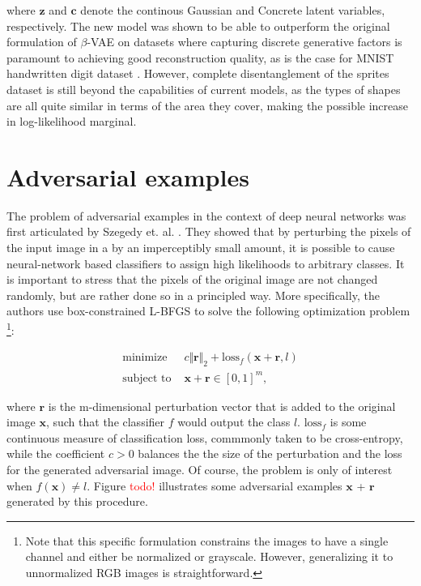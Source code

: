 \documentclass{report}
\newcommand\todo[1]{\textcolor{red}{#1}}
\begin{document}
\bigskip

\noindent where $\boldsymbol{z}$ and $\boldsymbol{c}$ denote the continous Gaussian and Concrete latent variables, respectively. The new model was shown to be able to outperform the original formulation of $\beta$-VAE on datasets where capturing discrete generative factors is paramount to achieving good reconstruction quality, as is the case for MNIST handwritten digit dataset \cite{mnist}. However, complete disentanglement of the sprites dataset is still beyond the capabilities of current models, as the types of shapes are all quite similar in terms of the area they cover, making the possible increase in log-likelihood marginal.

\section{Adversarial examples}

\noindent The problem of adversarial examples in the context of deep neural networks was first articulated by Szegedy et. al. \cite{intriguing-properties}. They showed that by perturbing the pixels of the input image in a by an imperceptibly small amount, it is possible to cause neural-network based classifiers to assign high likelihoods to arbitrary classes. It is important to stress that the pixels of the original image are not changed randomly, but are rather done so in a principled way. More specifically, the authors use box-constrained L-BFGS \cite{NoceWrig06} to solve the following optimization problem \footnote{Note that this specific formulation constrains the images to have a single channel and either be normalized or grayscale. However, generalizing it to unnormalized RGB images is straightforward.}:

\begin{equation}
\begin{aligned}
\text{minimize } &c \Vert \boldsymbol{r} \Vert_2 + \text{loss}_f(\boldsymbol{x}+\boldsymbol{r}, l) \\
\text{subject to } &\boldsymbol{x} + \boldsymbol{r} \in [0, 1]^m,
\end{aligned}
\label{eq:adv-class-opt}
\end{equation}

\bigskip

\noindent where $\boldsymbol{r}$ is the m-dimensional perturbation vector that is added to the original image $\boldsymbol{x}$, such that the classifier $f$ would output the class $l$. $\text{loss}_f$ is some continuous measure of classification loss, commmonly taken to be cross-entropy, while the coefficient $c > 0$ balances the the size of the perturbation and the loss for the generated adversarial image. Of course, the problem is only of interest when $f(\boldsymbol{x}) \neq l$. Figure \todo{todo!} illustrates some adversarial examples $\boldsymbol{x}$ + $\boldsymbol{r}$ generated by this procedure.
\end{document}
